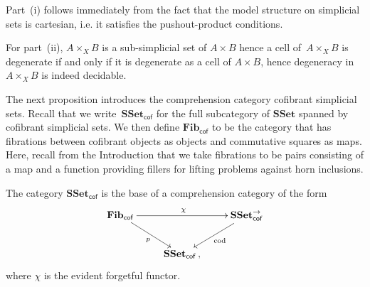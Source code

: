 \documentclass[reqno,10pt,a4paper,oneside,draft]{amsart}
\makeatletter
\renewenvironment{proof}[1][\proofname] {\par\pushQED{\qed}\normalfont\topsep6\p@\@plus6\p@\relax\trivlist\item[\hskip\labelsep\bf#1\@addpunct{.}]\ignorespaces}{\popQED\endtrivlist\@endpefalse}
\numberwithin{equation}{section}
\theoremstyle{mythm}
\theoremstyle{mydef}
\theoremstyle{myrmk}
\newcommand{\co}{\colon}
\newcommand{\SSet}{\mathbf{SSet}}
\makeatother
\begin{document}
\begin{proof} Part~(i) follows immediately from the fact that the model structure on simplicial sets is cartesian, i.e. it satisfies the pushout-product conditions.


For part~(ii), $A \times_X B$ is a sub-simplicial set of $A \times B$ hence a cell of~$A \times_X B$ is degenerate if and only if it is degenerate as a cell of $A \times B$, hence degeneracy
in~$A \times_X B$ is indeed decidable. 
\end{proof}


The next proposition introduces the  comprehension category  cofibrant simplicial sets.
Recall that we write~$\SSet_{\mathsf{cof}}$ for the full subcategory of  $\SSet$ spanned by
cofibrant simplicial sets. We then define $\mathbf{Fib}_{ \mathsf{cof}}$ to be the category that 
has fibrations between cofibrant objects as objects and commutative squares as maps. Here,
recall from the Introduction that we take fibrations to be pairs consisting of a map
and a function providing fillers for lifting problems against horn inclusions. 


\begin{proposition} \label{thm:compcat}
The category $\SSet_{\mathsf{cof}}$ is the base of a comprehension category
of the form
\begin{equation*}
\begin{gathered}
\xymatrix{
\mathbf{Fib}_{ \mathsf{cof}} \ar[dr]_{p} \ar[rr]^{\chi} & & \SSet^{\to}_{\mathsf{cof}} \ar[dl]^{\mathrm{cod}} \\ 
 & \SSet_{\mathsf{cof}} \, , &  }
 \end{gathered}
 \end{equation*}
 where $\chi$ is the evident forgetful functor.
\end{proposition} 
\end{document}
